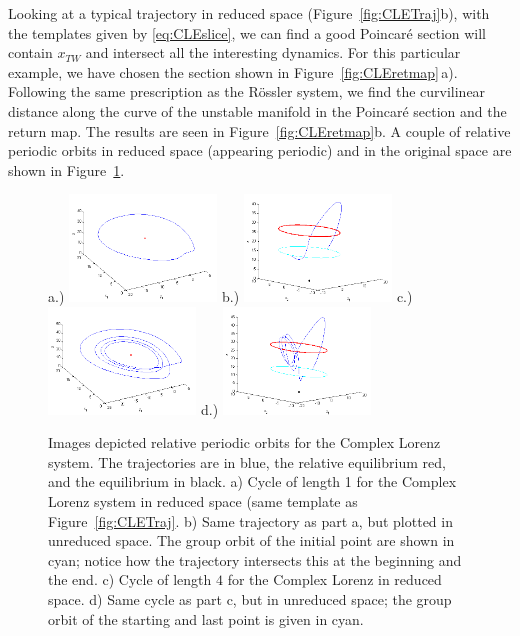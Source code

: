 \documentclass[12 pt]{article}
\begin{document}
Looking at a typical trajectory in reduced space
(Figure~\ref{fig:CLETraj}b), with the templates given by
\ref{eq:CLEslice}, we can find a good Poincar\'e section will contain
$x_{TW}$ and intersect all the interesting dynamics. For this particular
example, we have chosen the section shown in Figure~\ref{fig:CLEretmap}\,a).
Following the same prescription as the R\"ossler system, we find the
curvilinear distance along the curve of the unstable manifold in the
Poincar\'e section and the return map.  The results are seen in
Figure~\ref{fig:CLEretmap}b.  A couple of relative periodic orbits in
reduced space (appearing periodic) and in the original space are shown in
Figure~\ref{fig:CLEPO}.
 \begin{figure}
\centering
a.)  \includegraphics[width=0.35\textwidth]{Figs/Section3/kc1cyclec.png}
b.)
  \includegraphics[width=0.35\textwidth]{Figs/Section3/kc1cycleunredc.png}
c.)
  \includegraphics[width=0.35\textwidth]{Figs/Section3/kc4cyclec.png}
d.)
  \includegraphics[width=0.35\textwidth]{Figs/Section3/kc4cyclewithcirclec.png}
\caption{Images depicted relative periodic orbits for the Complex Lorenz
system.  The trajectories are in blue, the relative equilibrium red, and
the equilibrium in black.
a) Cycle of length 1 for the Complex Lorenz system in reduced space (same
template as Figure~\ref{fig:CLETraj}.
b) Same trajectory as part a, but plotted in unreduced space.  The group
orbit of the initial point are shown in cyan; notice how the trajectory
intersects this at the beginning and the end.
c) Cycle of length $4$ for the Complex Lorenz in reduced space.
d) Same cycle as part c, but in unreduced space; the group orbit of the
starting and last point is given in cyan. }
 \label{fig:CLEPO}
\end{figure}
\end{document}
